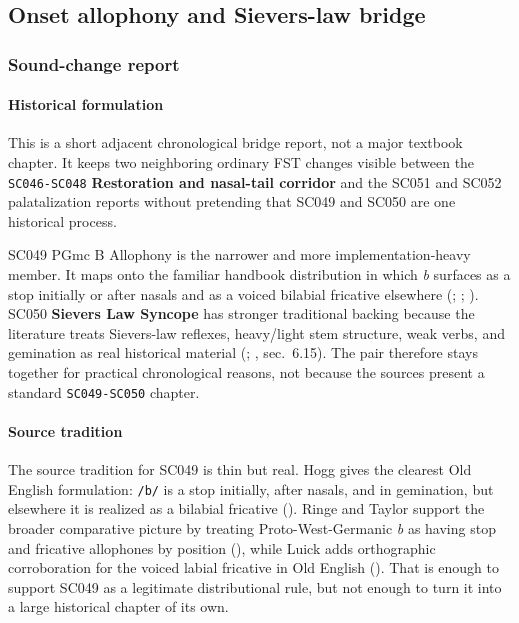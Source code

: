 \documentclass[
  british,
  a4paper,
]{article}
\begin{document}
\subsection{Onset allophony and Sievers-law
bridge}\label{onset-allophony-and-sievers-law-bridge}

\subsubsection{Sound-change report}\label{sound-change-report-30}

\paragraph{Historical formulation}\label{historical-formulation-30}

This is a short adjacent chronological bridge report, not a major
textbook chapter. It keeps two neighboring ordinary FST changes visible
between the \texttt{SC046-SC048} \textbf{Restoration and nasal-tail
corridor} and the SC051 and SC052 palatalization reports without
pretending that SC049 and SC050 are one historical process.

SC049 PGmc B Allophony is the narrower and more implementation-heavy
member. It maps onto the familiar handbook distribution in which
\emph{b} surfaces as a stop initially or after nasals and as a voiced
bilabial fricative elsewhere (; ;
). SC050
\textbf{Sievers Law Syncope} has stronger traditional backing because
the literature treats Sievers-law reflexes, heavy/light stem structure,
weak verbs, and gemination as real historical material
(;
, sec.~6.15). The pair therefore
stays together for practical chronological reasons, not because the
sources present a standard \texttt{SC049-SC050} chapter.

\paragraph{Source tradition}\label{source-tradition-30}

The source tradition for SC049 is thin but real. Hogg gives the clearest
Old English formulation: \texttt{/b/} is a stop initially, after nasals,
and in gemination, but elsewhere it is realized as a bilabial fricative
(). Ringe and Taylor support
the broader comparative picture by treating Proto-West-Germanic \emph{b}
as having stop and fricative allophones by position
(), while
Luick adds orthographic corroboration for the voiced labial fricative in
Old English (). That is
enough to support SC049 as a legitimate distributional rule, but not
enough to turn it into a large historical chapter of its own.
\end{document}
